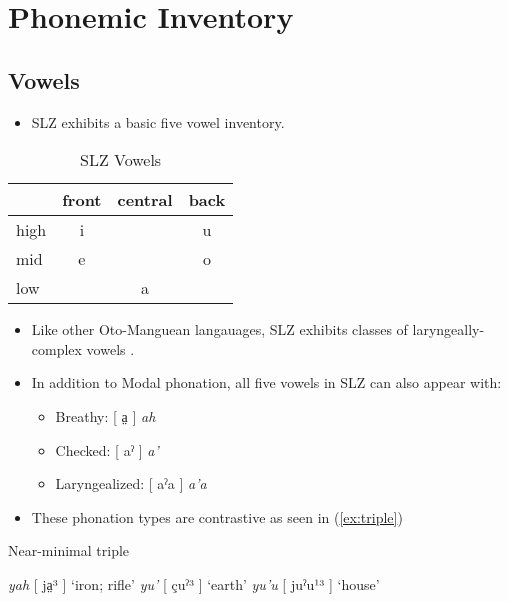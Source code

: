 \documentclass[12pt, letterpaper]{article}
\providecommand{\lsptoprule}{\midrule\toprule}
\providecommand{\lspbottomrule}{\bottomrule\midrule}
\begin{document}
\section{Phonemic Inventory} \label{sec:Inventory}

\subsection{Vowels}\label{sec:Vowel}
\begin{itemize}
	\item SLZ exhibits a basic five vowel inventory.
\end{itemize}

\begin{table}[!h]
\centering
\caption{SLZ Vowels}
\label{tab:vow}
 \begin{tabular}{lccc}
  \lsptoprule
            &  front& central  & back \\
  \midrule
	high   	&  i  &     &   u \\
	mid    	&  e  &   	& 	o \\
	low   	&     &  a 	&	  \\
  \lspbottomrule
 \end{tabular}
\end{table}

\begin{itemize}
	\item Like other Oto-Manguean langauages, SLZ exhibits classes of laryngeally-complex vowels \citep{silvermanLaryngealComplexityOtomanguean1997}.

	\item In addition to Modal phonation, all five vowels in SLZ can also appear with:
		\begin{itemize}
			\item Breathy: [ a̤ ] \textit{ah} 
			\item Checked: [ aˀ ] \textit{a'}
			\item Laryngealized: [ aˀa ] \textit{a'a}
		\end{itemize}

	\item These phonation types are contrastive as seen in (\ref{ex:triple})
\end{itemize}

\begin{exe}
	\ex \label{ex:triple} Near-minimal triple
	\begin{xlist} 
		\ex \textit{yah} [ ja̤³ ] `iron; rifle'
		\ex \textit{yu'} [ çuˀ³ ] `earth'
		\ex \textit{yu'u} [ juˀu¹³ ] `house' 
	\end{xlist} 
\end{exe} 
\end{document}
